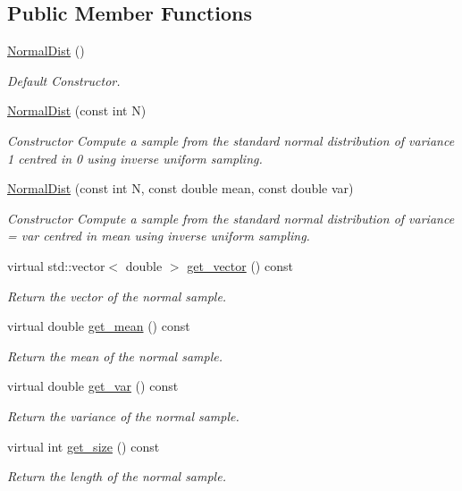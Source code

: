 \subsection*{Public Member Functions}
\begin{DoxyCompactItemize}
\item 
\mbox{\label{classNormalDist_ada1fce213a28e723f692f007d5964851}} 
\hyperlink{classNormalDist_ada1fce213a28e723f692f007d5964851}{Normal\+Dist} ()
\begin{DoxyCompactList}\small\item\em Default Constructor. \end{DoxyCompactList}\item 
\hyperlink{classNormalDist_acafd80c0e98d85ecac3acce4b7919b41}{Normal\+Dist} (const int N)
\begin{DoxyCompactList}\small\item\em Constructor Compute a sample from the standard normal distribution of variance 1 centred in 0 using inverse uniform sampling. \end{DoxyCompactList}\item 
\hyperlink{classNormalDist_ab26a2a8829a69838c683d3197420a672}{Normal\+Dist} (const int N, const double mean, const double var)
\begin{DoxyCompactList}\small\item\em Constructor Compute a sample from the standard normal distribution of variance = var centred in mean using inverse uniform sampling. \end{DoxyCompactList}\item 
virtual std\+::vector$<$ double $>$ \hyperlink{classNormalDist_a473e67b9d1787f6ff887f6854dbd350c}{get\+\_\+vector} () const
\begin{DoxyCompactList}\small\item\em Return the vector of the normal sample. \end{DoxyCompactList}\item 
virtual double \hyperlink{classNormalDist_a947707f47873251fd7857b4a7ed977bc}{get\+\_\+mean} () const
\begin{DoxyCompactList}\small\item\em Return the mean of the normal sample. \end{DoxyCompactList}\item 
virtual double \hyperlink{classNormalDist_a46bc646f126ac3c2d46bcd9ccbf01135}{get\+\_\+var} () const
\begin{DoxyCompactList}\small\item\em Return the variance of the normal sample. \end{DoxyCompactList}\item 
virtual int \hyperlink{classNormalDist_a6dcfba2a8149dbd527392c32b3d7a7a1}{get\+\_\+size} () const
\begin{DoxyCompactList}\small\item\em Return the length of the normal sample. \end{DoxyCompactList}\end{DoxyCompactItemize}
